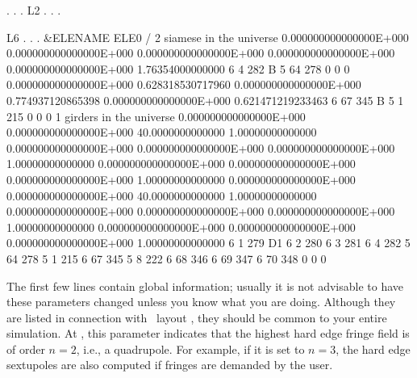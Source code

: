 {{
\begin{ptccode}
     .
     .
     .
L2 
     .
     .
     .
\end{ptccode}
\begin{ptccode}
L6
     .
     .
     .
 &ELENAME
 ELE0%
 /
           2  siamese in the universe \label{lin:mu:sia}
  0.000000000000000E+000  0.000000000000000E+000  0.000000000000000E+000  
  0.000000000000000E+000  0.000000000000000E+000   1.76354000000000        
           6           4         282 B                       
           5          64         278
           0           0           0
  0.000000000000000E+000  0.628318530717960       0.000000000000000E+000  \label{lin:sia:rot}
  0.774937120865398       0.000000000000000E+000  0.621471219233463            \label{lin:sia:tra}
           6          67         345 B                        \label{lin:sia:1}
           5           1         215                            \label{lin:sia:2}
           0           0           0
           1  girders in the universe 
  0.000000000000000E+000  0.000000000000000E+000   40.0000000000000      \label{lin:gir:f}
   1.00000000000000       0.000000000000000E+000  0.000000000000000E+000
  0.000000000000000E+000   1.00000000000000       0.000000000000000E+000
  0.000000000000000E+000  0.000000000000000E+000   1.00000000000000     
  0.000000000000000E+000  0.000000000000000E+000   40.0000000000000     
   1.00000000000000       0.000000000000000E+000  0.000000000000000E+000
  0.000000000000000E+000   1.00000000000000       0.000000000000000E+000
  0.000000000000000E+000  0.000000000000000E+000   1.00000000000000     
           6           1         279 D1      \label{lin:gir:m}                  
           6           2         280
           6           3         281
           6           4         282     \label{lin:gir:s11} 
           5          64         278    \label{lin:gir:s12} 
           5           1         215     \label{lin:gir:s22} 
           6          67         345    \label{lin:gir:s21}       
           5           8         222
           6          68         346
           6          69         347
           6          70         348
           0           0           0
\end{ptccode}

The first few lines contain global information; usually it is not advisable to have these parameters  changed unless you know what you are doing. Although they are listed in connection with \DNA\ layout , they should be common to your entire simulation. At , this parameter indicates that the highest hard edge  fringe field is of order $n=2$, i.e., a quadrupole. For example, if it is set to $n=3$,  the hard edge sextupoles are also computed if fringes are demanded by the user. 

}}
